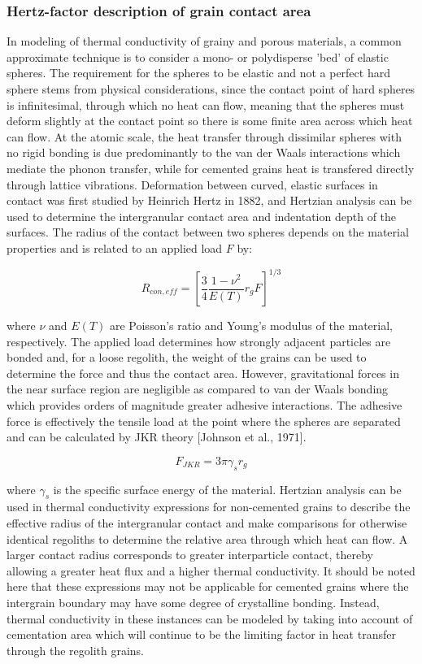 \documentclass[11pt]{article} %
\begin{document}
\subsubsection{Hertz-factor description of grain contact area}
	In modeling of thermal conductivity of grainy and porous materials, a common approximate technique is to consider a mono- or polydisperse 'bed' of elastic spheres. The requirement for the spheres to be elastic and not a perfect hard sphere stems from physical considerations, since the contact point of hard spheres is infinitesimal, through which no heat can flow, meaning that the spheres must deform slightly at the contact point so there is some finite area across which heat can flow. At the atomic scale, the heat transfer through dissimilar spheres with no rigid bonding is due predominantly to the van der Waals interactions which mediate the phonon transfer, while for cemented grains heat is transfered directly through lattice vibrations. Deformation between curved, elastic surfaces in contact was first studied by Heinrich Hertz in 1882, and Hertzian analysis can be used to determine the intergranular contact area and indentation depth of the surfaces. The radius of the contact between two spheres depends on the material properties and is related to an applied load $F$ by:

	\begin{equation}
	R_{con,eff} = \left[ \frac{3}{4} \frac{1 - \nu^{2}}{E(T)} r_{g} F \right]^{1/3}
	\end{equation}

	where $\nu$ and $E(T)$ are Poisson's ratio and Young's modulus of the material, respectively. The applied load determines how strongly adjacent particles are bonded and, for a loose regolith, the weight of the grains can be used to determine the force and thus the contact area. However, gravitational forces in the near surface region are negligible as compared to van der Waals bonding which provides orders of magnitude greater adhesive interactions. The adhesive force is effectively the tensile load at the point where the spheres are separated and can be calculated by JKR theory [Johnson et al., 1971].
	 
	 \begin{equation}
	 F_{JKR} = 3 \pi \gamma_{s} r_{g}
	 \end{equation} 
	 
	 where $\gamma_{s}$ is the specific surface energy of the material. Hertzian analysis can be used in thermal conductivity expressions for non-cemented grains to describe the effective radius of the intergranular contact and make comparisons for otherwise identical regoliths to determine the relative area through which heat can flow. A larger contact radius corresponds to greater interparticle contact, thereby allowing a greater heat flux and a higher thermal conductivity. It should be noted here that these expressions may not be applicable for cemented grains where the intergrain boundary may have some degree of crystalline bonding. Instead, thermal conductivity in these instances can be modeled by taking into account of cementation area which will continue to be the limiting factor in heat transfer through the regolith grains. 
\end{document}
